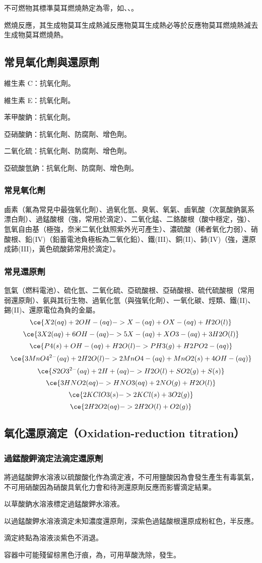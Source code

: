 \documentclass[a4paper,12pt]{article}
\begin{document}
不可燃物其標準莫耳燃燒熱定為零，如、、。

燃燒反應，其生成物莫耳生成熱減反應物莫耳生成熱必等於反應物莫耳燃燒熱減去生成物莫耳燃燒熱。
\subsection{常見氧化劑與還原劑}
\bit
\item 維生素 C：抗氧化劑。
\item 維生素 E：抗氧化劑。
\item 苯甲酸鈉：抗氧化劑。
\item 亞硝酸鈉：抗氧化劑、防腐劑、增色劑。
\item 二氧化硫：抗氧化劑、防腐劑、增色劑。
\item 亞硫酸氫鈉：抗氧化劑、防腐劑、增色劑。
\eit
\subsubsection{常見氧化劑}
鹵素（氟為常見中最強氧化劑）、過氧化氫、臭氧、氧氣、鹵氧酸（次氯酸鈉氯系漂白劑）、過錳酸根（強，常用於滴定）、二氧化錳、二鉻酸根（酸中穩定，強）、氫氧自由基（極強，奈米二氧化鈦照紫外光可產生）、濃硫酸（稀者氧化力弱）、硝酸根、鉛(IV)（鉛蓄電池負極板為二氧化鉛）、鐵(III)、銅(II)、鈰(IV)（強，還原成鈰(III)，黃色硫酸鈰常用於滴定）。
\subsubsection{常見還原劑}
氫氣（燃料電池）、硫化氫、二氧化硫、亞硫酸根、亞硝酸根、硫代硫酸根（常用弱還原劑）、氨與其衍生物、過氧化氫（與強氧化劑）、一氧化碳、烴類、鐵(II)、錫(II)、還原電位為負的金屬。
\[\ce{X2(aq) + 2OH-(aq) -> X-(aq) + OX-(aq) + H2O(l)}\]
\[\ce{3X2(aq) + 6OH-(aq) -> 5X-(aq) + XO3-(aq) + 3H2O(l)}\]
\[\ce{P4(s) + OH-(aq) + H2O(l) -> PH3(g) + H2PO2-(aq)}\]
\[\ce{3MnO4^{2-}(aq) + 2H2O(l) -> 2MnO4-(aq) + MnO2(s) + 4OH-(aq)}\]
\[\ce{S2O3^{2-}(aq) + 2H+(aq) -> H2O(l) + SO2(g) + S(s)}\]
\[\ce{3HNO2(aq) -> HNO3(aq) + 2NO(g) + H2O(l)}\]
\[\ce{2KClO3(s) -> 2KCl(s) + 3O2(g)}\]
\[\ce{2H2O2(aq) -> 2H2O(l) + O2(g)}\]
\subsection{氧化還原滴定（Oxidation-reduction titration）}
\subsubsection{過錳酸鉀滴定法滴定還原劑}
\ben
\item 將過錳酸鉀水溶液以硫酸酸化作為滴定液，不可用鹽酸因為會發生產生有毒氯氣，不可用硝酸因為硝酸具氧化力會和待測還原劑反應而影響滴定結果。
\item 以草酸鈉水溶液標定過錳酸鉀水溶液。
\item 以過錳酸鉀水溶液滴定未知濃度還原劑，深紫色過錳酸根還原成粉紅色，半反應。
\item 滴定終點為溶液淡紫色不消退。
\item 容器中可能殘留棕黑色汙痕，為，可用草酸洗除，發生。
\een
\end{document}
